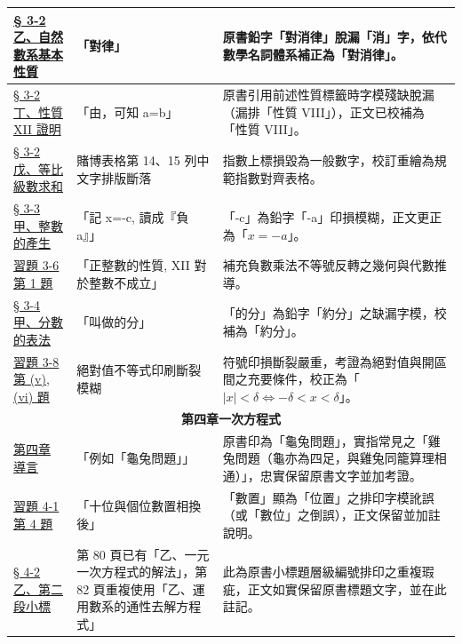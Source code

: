 \documentclass[a4paper,12pt,twoside]{article}
\begin{document}
\begin{table}[H]
\begin{tabularx}{\textwidth}{|p{3.0cm}|p{3.8cm}|X|}
\hyperref[subsec:nat_axioms]{§ 3-2 乙、自然數系基本性質} & 
「對律」 & 
原書鉛字「對消律」脫漏「消」字，依代數學名詞體系補正為「對消律」。 \\ \hline

\hyperref[prop:nat_xii]{§ 3-2 丁、性質 XII 證明} & 
「由，可知 a=b」 & 
原書引用前述性質標籤時字模殘缺脫漏（漏排「性質 VIII」），正文已校補為「性質 VIII」。 \\ \hline

\hyperref[ex:powers_of_two_sum]{§ 3-2 戊、等比級數求和} & 
賭博表格第 14、15 列中文字排版斷落 & 
指數上標損毀為一般數字，校訂重繪為規範指數對齊表格。 \\ \hline

\hyperref[subsec:int_generation]{§ 3-3 甲、整數的產生} & 
「記 x=-c, 讀成『負 a』」 & 
「-c」為鉛字「-a」印損模糊，正文更正為「$x = -a$」。 \\ \hline

\hyperref[sec:ex3-6]{習題 3-6 第 1 題} & 
「正整數的性質, XII 對於整數不成立」 & 
補充負數乘法不等號反轉之幾何與代數推導。 \\ \hline

\hyperref[subsec:fractions]{§ 3-4 甲、分數的表法} & 
「叫做的分」 & 
「的分」為鉛字「約分」之缺漏字模，校補為「約分」。 \\ \hline

\hyperref[sec:ex3-8]{習題 3-8 第 (v), (vi) 題} & 
絕對值不等式印刷斷裂模糊 & 
符號印損斷裂嚴重，考證為絕對值與開區間之充要條件，校正為「$|x| < \delta \iff -\delta < x < \delta$」。 \\ \hline

\multicolumn{3}{|c|}{\textbf{第四章\quad 一次方程式}} \\ \hline

\hyperref[sec:ch4]{第四章 導言} & 
「例如「龜兔問題」」 & 
原書印為「龜兔問題」，實指常見之「雞兔問題（龜亦為四足，與雞兔同籠算理相通）」，忠實保留原書文字並加考證。 \\ \hline

\hyperref[item:ex4-1-4]{習題 4-1 第 4 題} & 
「十位與個位數置相換後」 & 
「數置」顯為「位置」之排印字模訛誤（或「數位」之倒誤），正文保留並加註說明。 \\ \hline

\hyperref[subsec:4-2-b2]{§ 4-2 乙、第二段小標} & 
第 80 頁已有「乙、一元一次方程式的解法」，第 82 頁重複使用「乙、運用數系的通性去解方程式」 & 
此為原書小標題層級編號排印之重複瑕疵，正文如實保留原書標題文字，並在此註記。 \\ \hline


\end{tabularx}
\end{table}
\end{document}
